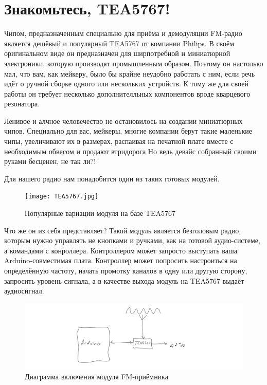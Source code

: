 \section{Знакомьтесь, TEA5767!}

Чипом, предназначенным специально для приёма и демодуляции FM-радио является дешёвый и популярный TEA5767 от компании Philips. В своём оригинальном виде он предназначен для ширпотребной и миниатюрной электроники, которую производят промышленным образом. Поэтому он настолько мал, что вам, как мейкеру, было бы крайне неудобно работать с ним, если речь идёт о ручной сборке одного или нескольких устройств. К тому же для своей работы он требует несколько дополнителльных компонентов вроде кварцевого резонатора.

Ленивое и алчное человечество не остановилось на создании миниатюрных чипов. Специально для вас, мейкеры, многие компании берут такие маленькие чипы, увеличивают их в размерах, распаивая на печатной плате вместе с необходимым обвесом и продают втридорога  Но ведь девайс собранный своими руками бесценен, не так ли?!

Для нашего радио нам понадобится один из таких готовых модулей.

\begin{figure}
  \centering
  \texttt{[image: TEA5767.jpg]}
  \caption{Популярные вариации модуля на базе TEA5767}
\end{figure}

Что же он из себя представляет? Такой модуль является безголовым радио, которым нужно управлять не кнопками и ручками, как на готовой аудио-системе, а командами с конроллера. Контроллером может запросто выступать ваша Arduino-совместимая плата. Контроллер может попросить настроиться на определённую частоту, начать промотку каналов в одну или другую сторону, запросить уровень сигнала, а в качестве выхода модуль на TEA5767 выдаёт аудиосигнал.

\begin{figure}
  \centering
  \includegraphics{sketches/fm-receiver-diagram}
  \caption{Диаграмма включения модуля FM-приёмника}
\end{figure}

